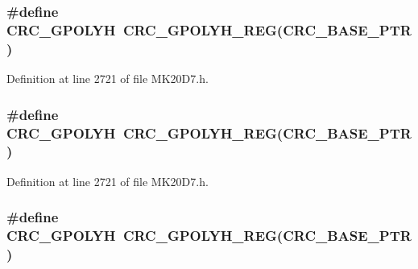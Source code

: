 \subsubsection[{\texorpdfstring{C\+R\+C\+\_\+\+G\+P\+O\+L\+YH}{CRC_GPOLYH}}]{\setlength{\rightskip}{0pt plus 5cm}\#define C\+R\+C\+\_\+\+G\+P\+O\+L\+YH~{\bf C\+R\+C\+\_\+\+G\+P\+O\+L\+Y\+H\+\_\+\+R\+EG}({\bf C\+R\+C\+\_\+\+B\+A\+S\+E\+\_\+\+P\+TR})}\hypertarget{group___c_r_c___register___accessor___macros_ga48bbad74b5c22f8e3fb65e178dd5c21d}{}\label{group___c_r_c___register___accessor___macros_ga48bbad74b5c22f8e3fb65e178dd5c21d}


Definition at line 2721 of file M\+K20\+D7.\+h.

\subsubsection[{\texorpdfstring{C\+R\+C\+\_\+\+G\+P\+O\+L\+YH}{CRC_GPOLYH}}]{\setlength{\rightskip}{0pt plus 5cm}\#define C\+R\+C\+\_\+\+G\+P\+O\+L\+YH~{\bf C\+R\+C\+\_\+\+G\+P\+O\+L\+Y\+H\+\_\+\+R\+EG}({\bf C\+R\+C\+\_\+\+B\+A\+S\+E\+\_\+\+P\+TR})}\hypertarget{group___c_r_c___register___accessor___macros_ga48bbad74b5c22f8e3fb65e178dd5c21d}{}\label{group___c_r_c___register___accessor___macros_ga48bbad74b5c22f8e3fb65e178dd5c21d}


Definition at line 2721 of file M\+K20\+D7.\+h.

\subsubsection[{\texorpdfstring{C\+R\+C\+\_\+\+G\+P\+O\+L\+YH}{CRC_GPOLYH}}]{\setlength{\rightskip}{0pt plus 5cm}\#define C\+R\+C\+\_\+\+G\+P\+O\+L\+YH~{\bf C\+R\+C\+\_\+\+G\+P\+O\+L\+Y\+H\+\_\+\+R\+EG}({\bf C\+R\+C\+\_\+\+B\+A\+S\+E\+\_\+\+P\+TR})}\hypertarget{group___c_r_c___register___accessor___macros_ga48bbad74b5c22f8e3fb65e178dd5c21d}{}\label{group___c_r_c___register___accessor___macros_ga48bbad74b5c22f8e3fb65e178dd5c21d}


